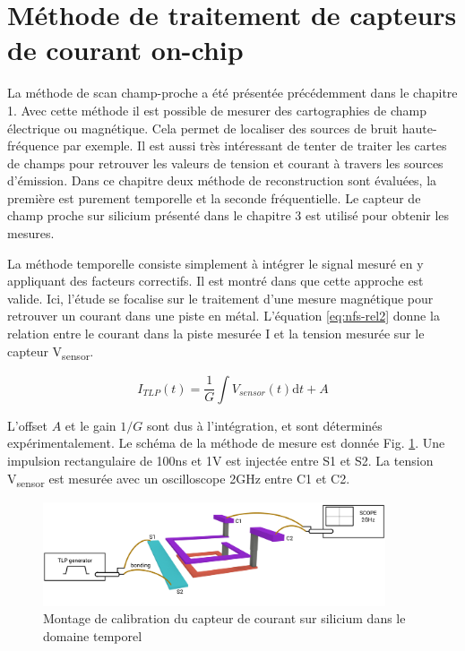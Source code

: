 \section{Méthode de traitement de capteurs de courant on-chip}

La méthode de scan champ-proche a été présentée précédemment dans le chapitre 1.
Avec cette méthode il est possible de mesurer des cartographies de champ électrique ou magnétique.
Cela permet de localiser des sources de bruit haute-fréquence par exemple.
Il est aussi très intéressant de tenter de traiter les cartes de champs pour retrouver les valeurs de tension et courant à travers les sources d'émission.
Dans ce chapitre deux méthode de reconstruction sont évaluées, la première est purement temporelle et la seconde fréquentielle.
Le capteur de champ proche sur silicium présenté dans le chapitre 3 est utilisé pour obtenir les mesures.

La méthode temporelle consiste simplement à intégrer le signal mesuré en y appliquant des facteurs correctifs.
Il est montré dans \cite{near-field-scan} que cette approche est valide.
Ici, l'étude se focalise sur le traitement d'une mesure magnétique pour retrouver un courant dans une piste en métal.
L'équation \ref{eq:nfs-rel2} donne la relation entre le courant dans la piste mesurée I et la tension mesurée sur le capteur V\textsubscript{sensor}.

\begin{equation}
I_{TLP}(t) = \frac{1}{G}\int V_{sensor}(t) \mathrm{d}t + A
\label{eq:nfs-rel2}
\end{equation}

L'offset $A$ et le gain $1/G$ sont dus à l'intégration, et sont déterminés expérimentalement.
Le schéma de la méthode de mesure est donnée Fig. \ref{fig:calibration-sensor}.
Une impulsion rectangulaire de 100ns et 1V est injectée entre S1 et S2.
La tension V\textsubscript{sensor} est mesurée avec un oscilloscope 2GHz entre C1 et C2.

\begin{figure}[!h]
  \centering
  \includegraphics[width=0.9\textwidth]{src/1/figures/sensor_measurement_setup.pdf}
  \caption{Montage de calibration du capteur de courant sur silicium dans le domaine temporel}
  \label{fig:calibration-sensor}
\end{figure}

